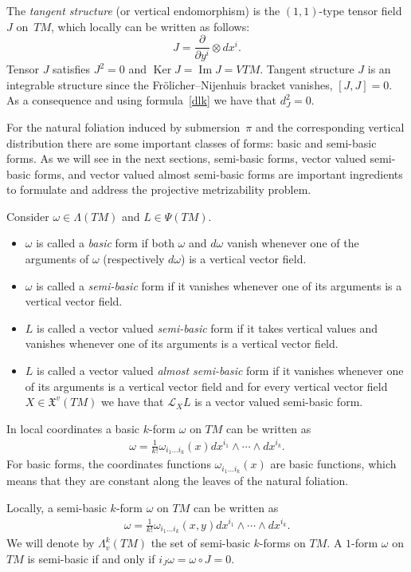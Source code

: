 The \emph{tangent structure} (or vertical endomorphism) is the
$(1,1)$-type tensor f\/ield $J$ on~$TM$, which locally can be
written as follows:
\[
J=\frac{\partial}{\partial y^i} \otimes dx^i.
\]
Tensor $J$ satisf\/ies $J^2=0$ and $\operatorname{Ker} J=
\operatorname{Im} J=VTM$. Tangent structure $J$ is an integrable structure
since the Fr\"olicher--Nijenhuis bracket vanishes, $[J,J]=0$. As a consequence and using formula~\eqref{dlk} we have that
$d_J^2=0$.

For the natural foliation induced by submersion~$\pi$ and the
corresponding vertical distribution there are some important classes
of forms: basic and semi-basic forms. As we will see in the next
sections, semi-basic forms, vector valued semi-basic forms, and vector valued almost
semi-basic forms are important ingredients to formulate and
address the projective metrizability problem.
\begin{Definition} Consider $\omega\in \Lambda(TM)$ and $L\in \Psi(TM)$.
\begin{itemize}\itemsep=0pt
\item[i)] $\omega$ is called a \emph{basic} form if both $\omega$ and
  $d\omega$ vanish whenever one of the arguments of $\omega$
  (respectively $d\omega$) is a vertical vector f\/ield.
\item[ii)] $\omega$ is called a \emph{semi-basic} form if it vanishes whenever
one of its arguments is a vertical vector f\/ield.
\item[iii)] $L$ is called a vector valued \emph{semi-basic} form if it takes vertical values and vanishes
whenever one of its arguments is a vertical vector f\/ield.
\item[iv)] $L$ is called a vector valued \emph{almost semi-basic} form
  if it vanishes whenever one of its arguments is a vertical vector f\/ield
and for every vertical vector f\/ield $X\in {\mathfrak X}^v(TM)$ we
have that $\mathcal{L}_XL$ is a vector valued semi-basic form.
\end{itemize}
\end{Definition}
In local coordinates a basic $k$-form $\omega$ on $TM$ can
be written as
\begin{gather*}
 \omega=\frac{1}{k!}\omega_{i_1\dots i_k}(x)dx^{i_1}\wedge \cdots
\wedge dx^{i_k}.%
\end{gather*}
For basic forms, the coordinates functions $\omega_{i_1\dots i_k}(x)$ are basic
functions, which means that they are constant along the leaves of the
natural foliation.

Locally, a semi-basic $k$-form $\omega$ on $TM$ can
be written as
\begin{gather}
 \omega=\frac{1}{k!}\omega_{i_1\dots i_k}(x,y)dx^{i_1}\wedge \cdots
\wedge dx^{i_k}.\label{eq:smf}
\end{gather}
We will denote by $\Lambda^k_v(TM)$ the set of
semi-basic $k$-forms on $TM$. A $1$-form $\omega$ on $TM$ is
semi-basic if and only if $i_J\omega=\omega \circ J=0$.

